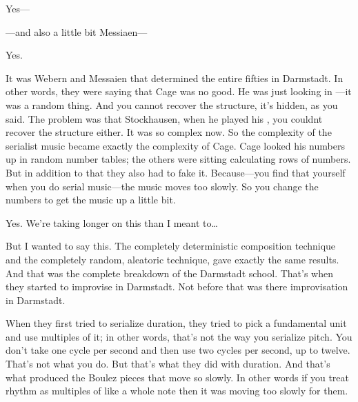  Yes--- 

 ---and also a little bit Messiaen--- 

 Yes. 

 It was Webern and Messaien that determined the entire 
fifties in Darmstadt. In other words, they were saying that Cage was no 
good. He was just looking in ---it was a random thing. And you 
cannot recover the structure, it's hidden, as you said. The problem was 
that Stockhausen, when he played his , you couldnt 
recover the structure either. It was so complex now. So the complexity 
of the serialist music became exactly the complexity of Cage. Cage 
looked his numbers up in random number tables; the others were 
sitting calculating rows of numbers. But in addition to that they also 
had to fake it. Because---you find that yourself when you do serial 
music---the music moves too slowly. So you change the numbers to get 
the music up a little bit. 

 Yes. We're taking longer on this than I meant to\ldots

 But I wanted to say this. The completely deterministic composition technique and the completely random, aleatoric technique, 
gave exactly the same results. And that was the complete breakdown of 
the Darmstadt school. That's when they started to improvise in Darmstadt. Not before that was there improvisation in Darmstadt. 

 When they first tried to serialize duration, they tried to pick a 
fundamental unit and use multiples of it; in other words, that's not the 
way you serialize pitch. You don't take one cycle per second and then 
use two cycles per second, up to twelve. That's not what you do. But 
that's what they did with duration. And that's what produced the 
Boulez pieces that move so slowly. In other words if you treat rhythm as 
multiples of like a whole note then it was moving too slowly for them. 

